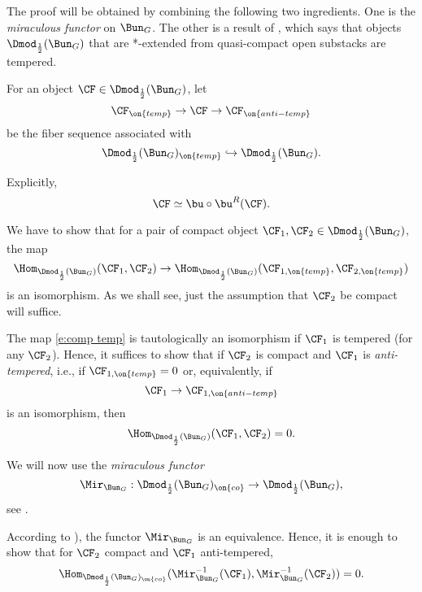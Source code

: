 \documentclass[9pt]{amsart}
\theoremstyle{remark}
\theoremstyle{definition}
\theoremstyle{remark}
\newcommand{\propref}[1]{Proposition~\ref{#1}}
\numberwithin{equation}{section}
\begin{document}
\ssec{Proof of \propref{p:uR ff on compacts}}

The proof will be obtained by combining the following two ingredients. One is the \emph{miraculous functor} on
$\Bun_G$. The other is a result of \cite{Be1}, which says that objects $\Dmod_{\frac{1}{2}}(\Bun_G)$ that are *-extended
from quasi-compact open substacks are tempered. 

\sssec{}

For an object $\CF\in \Dmod_{\frac{1}{2}}(\Bun_G)$, let
$$\CF_{\on{temp}}\to \CF\to \CF_{\on{anti-temp}}$$
be the fiber sequence associated with 
$$\Dmod_{\frac{1}{2}}(\Bun_G)_{\on{temp}}\hookrightarrow \Dmod_{\frac{1}{2}}(\Bun_G).$$

Explicitly,
$$\CF\simeq \bu\circ \bu^R(\CF).$$

\medskip


We have to show that for a pair of compact object $\CF_1,\CF_2\in \Dmod_{\frac{1}{2}}(\Bun_G)$, the map
\begin{equation} \label{e:comp temp}
\Hom_{\Dmod_{\frac{1}{2}}(\Bun_G)}(\CF_1,\CF_2)\to \Hom_{\Dmod_{\frac{1}{2}}(\Bun_G)}(\CF_{1,\on{temp}},\CF_{2,\on{temp}})
\end{equation} 
is an isomorphism. As we shall see, just the assumption that $\CF_2$ be compact will suffice. 

\medskip

The map \eqref{e:comp temp} is tautologically an isomorphism if $\CF_1$ is tempered (for any $\CF_2$). Hence, it suffices to show that 
if $\CF_2$ is compact and $\CF_1$ is \emph{anti-tempered}, i.e., if $\CF_{1,\on{temp}}=0$ or, equivalently, if 
$$\CF_1\to \CF_{1,\on{anti-temp}}$$
is an isomorphism, then
$$\Hom_{\Dmod_{\frac{1}{2}}(\Bun_G)}(\CF_1,\CF_2)=0.$$

\sssec{}

We will now use the \emph{miraculous functor} 
$$\Mir_{\Bun_G}:\Dmod_{\frac{1}{2}}(\Bun_G)_{\on{co}}\to \Dmod_{\frac{1}{2}}(\Bun_G),$$
see \cite[Sect. 3.1.1]{Ga1}. 

\medskip

According to \cite[Theorem 3.1.5]{Ga1}), the functor $\Mir_{\Bun_G}$ is an equivalence. Hence, it is enough to show
that for $\CF_2$ compact and $\CF_1$ anti-tempered, 
\begin{equation} \label{e:Hom into mir comp}
\Hom_{\Dmod_{\frac{1}{2}}(\Bun_G)_{\on{co}}}(\Mir^{-1}_{\Bun_G}(\CF_1),\Mir^{-1}_{\Bun_G}(\CF_2))=0.
\end{equation}

\sssec{}
\end{document}

